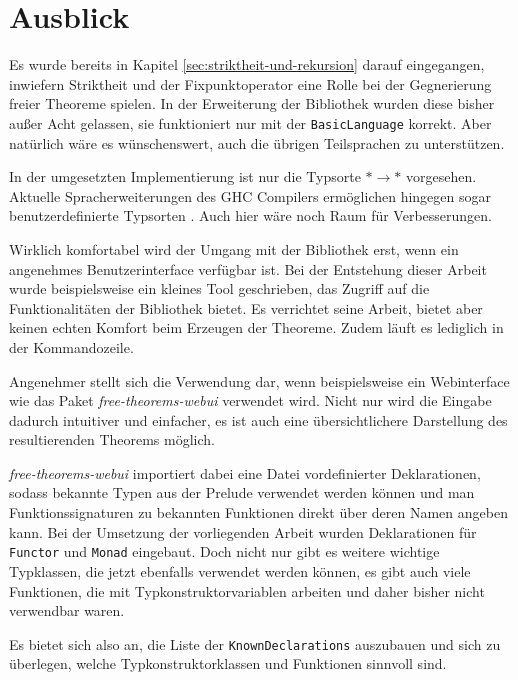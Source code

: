 \section{Ausblick}

Es wurde bereits in Kapitel \ref{sec:striktheit-und-rekursion} darauf eingegangen, inwiefern Striktheit und der Fixpunktoperator
eine Rolle bei der Gegnerierung freier Theoreme spielen. In der Erweiterung der Bibliothek wurden diese bisher außer Acht gelassen,
sie funktioniert nur mit der \texttt{BasicLanguage} korrekt. Aber natürlich wäre es wünschenswert, auch die übrigen
Teilsprachen zu unterstützen.


In der umgesetzten Implementierung ist nur die Typsorte $* \rightarrow *$ vorgesehen. Aktuelle Spracherweiterungen des
GHC Compilers ermöglichen hingegen sogar benutzerdefinierte Typsorten \cite{yorgey} \cite{atkey} . Auch
hier wäre noch Raum für Verbesserungen.

Wirklich komfortabel wird der Umgang mit der Bibliothek erst, wenn ein angenehmes Benutzerinterface verfügbar ist.
Bei der Entstehung dieser Arbeit wurde beispielsweise ein kleines Tool geschrieben, das Zugriff auf die Funktionalitäten
der Bibliothek bietet. Es verrichtet seine Arbeit, bietet aber keinen echten Komfort beim Erzeugen der Theoreme. Zudem
läuft es lediglich in der Kommandozeile.

Angenehmer stellt sich die Verwendung dar, wenn beispielsweise ein Webinterface wie das Paket \textit{free-theorems-webui}
\cite{freetheoremswebui} verwendet wird. Nicht nur wird die Eingabe dadurch intuitiver und einfacher, es ist auch eine
übersichtlichere Darstellung des resultierenden Theorems möglich.

\textit{free-theorems-webui} importiert dabei eine Datei vordefinierter Deklarationen, sodass bekannte Typen aus der
Prelude verwendet werden können und man Funktionssignaturen zu bekannten Funktionen direkt über deren Namen
angeben kann. Bei der Umsetzung der vorliegenden Arbeit wurden Deklarationen für \texttt{Functor} und \texttt{Monad}
eingebaut. Doch nicht nur gibt es weitere wichtige Typklassen, die jetzt ebenfalls verwendet werden können, es gibt
auch viele Funktionen, die mit Typkonstruktorvariablen arbeiten und daher bisher nicht verwendbar waren.

Es bietet sich also an, die Liste der \texttt{KnownDeclarations} auszubauen und sich zu überlegen, welche
Typkonstruktorklassen und Funktionen sinnvoll sind.
